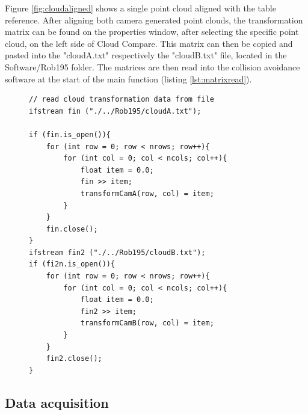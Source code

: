 Figure \ref{fig:cloudaligned} shows a single point cloud aligned with the table reference. After aligning both camera generated point clouds, the transformation matrix can be found on the properties window, after selecting the specific point cloud, on the left side of Cloud Compare. This matrix can then be copied and pasted into the "cloudA.txt" respectively the "cloudB.txt" file, located in the Software/Rob195 folder. The matrices are then read into the collision avoidance software at the start of the main function (listing \ref{lst:matrixread}).
\begin{figure}[H]
\begin{lstlisting}[frame = single, caption={part of the main function of the collision avoidance system which reads the transformation matrices for camera A and B.}, captionpos=b, label={lst:matrixread}]  
// read cloud transformation data from file
ifstream fin ("./../Rob195/cloudA.txt");

if (fin.is_open()){
	for (int row = 0; row < nrows; row++){
		for (int col = 0; col < ncols; col++){
			float item = 0.0;
			fin >> item;
			transformCamA(row, col) = item;
		}
	}	
	fin.close();
}
ifstream fin2 ("./../Rob195/cloudB.txt");
if (fi2n.is_open()){
	for (int row = 0; row < nrows; row++){
		for (int col = 0; col < ncols; col++){
			float item = 0.0;
			fin2 >> item;
			transformCamB(row, col) = item;
		}
	}
	fin2.close();
}
\end{lstlisting}
\end{figure}
\subsection{Data acquisition}
\label{subsec:dataacq}

